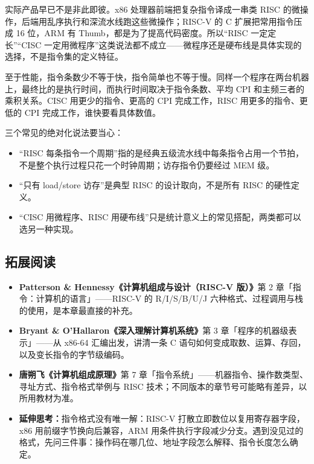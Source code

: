 实际产品早已不是非此即彼。x86 处理器前端把复杂指令译成一串类 RISC 的微操作，后端用乱序执行和深流水线跑这些微操作；RISC-V 的 C 扩展把常用指令压成 16 位，ARM 有 Thumb，都是为了提高代码密度。所以“RISC 一定定长”“CISC 一定用微程序”这类说法都不成立——微程序还是硬布线是具体实现的选择，不是指令集的定义特征。

至于性能，指令条数少不等于快，指令简单也不等于慢。同样一个程序在两台机器上，最终比的是执行时间，而执行时间取决于指令条数、平均 CPI 和主频三者的乘积关系。CISC 用更少的指令、更高的 CPI 完成工作，RISC 用更多的指令、更低的 CPI 完成工作，谁快要看具体数值。

\begin{attention}
三个常见的绝对化说法要当心：
\begin{itemize}
    \item “RISC 每条指令一个周期”指的是经典五级流水线中每条指令占用一个节拍，不是整个执行过程只花一个时钟周期；访存指令仍要经过 MEM 级。
    \item “只有 load/store 访存”是典型 RISC 的设计取向，不是所有 RISC 的硬性定义。
    \item “CISC 用微程序、RISC 用硬布线”只是统计意义上的常见搭配，两类都可以选另一种实现。
\end{itemize}
\end{attention}

\subsection{拓展阅读}

\begin{itemize}
    \item \textbf{Patterson \& Hennessy《计算机组成与设计（RISC-V 版）》}第 2 章「指令：计算机的语言」——RISC-V 的 R/I/S/B/U/J 六种格式、过程调用与栈的使用，是本章最直接的补充。

    \item \textbf{Bryant \& O'Hallaron《深入理解计算机系统》}第 3 章「程序的机器级表示」——从 x86-64 汇编出发，讲清一条 C 语句如何变成取数、运算、存回，以及变长指令的字节级编码。

    \item \textbf{唐朔飞《计算机组成原理》}第 7 章「指令系统」——机器指令、操作数类型、寻址方式、指令格式举例与 RISC 技术；不同版本的章节号可能略有差异，以所用教材为准。

    \item \textbf{延伸思考：}指令格式没有唯一解：RISC-V 打散立即数位以复用寄存器字段，x86 用前缀字节换向后兼容，ARM 用条件执行字段减少分支。遇到没见过的格式，先问三件事：操作码在哪几位、地址字段怎么解释、指令长度怎么确定。
\end{itemize}

\newpage

